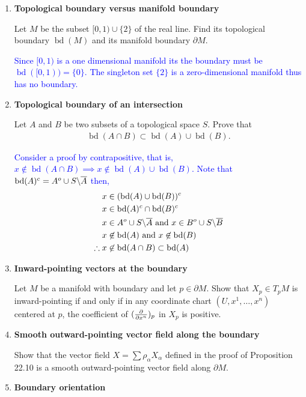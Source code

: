 \documentclass[12pt,a4paper]{report}
\newcommand{\BLUE}[1]{\textcolor{blue}{#1}}
\newcommand{\BD}{\operatorname{bd}}
\begin{document}
\HLINE
\begin{enumerate}[label=22.\arabic*]

\item \textbf{Topological boundary versus manifold boundary}

Let $M$ be the subset $[0,1) \cup \{2\}$ of the real line.  Find its topological boundary $\BD(M)$ and its manifold boundary $\partial M$.

\BLUE{
Since $[0,1)$ is a one dimensional manifold its the boundary must be $\BD([0,1)) = \{0\}$.  The singleton set $\{2\}$ is a zero-dimensional manifold thus has no boundary.
}

\item \textbf{Topological boundary of an intersection}

Let $A$ and $B$ be two subsets of a topological space $S$.  Prove that
\begin{align*}
	\BD(A \cap B) \subset \BD(A) \cup \BD(B).
\end{align*}

\BLUE{Consider a proof by contrapositive, that is, $x\not \in 	\BD(A \cap B) \implies  x\not \in \BD(A) \cup \BD(B)$.  Note that
$\BD(A)^c = A^o\cup S \backslash \CONJ{A}$ then,
\begin{align*}
	x &\in (\BD(A) \cup \BD(B))^c\\
	x &\in \BD(A)^c \cap \BD(B)^c \\
	x &\in A^o\cup S \backslash \CONJ{A} \AND x \in B^o\cup S \backslash \CONJ{B}\\
	x &\not \in \BD(A) \AND x \not \in \BD(B) \\
	\therefore x &\not \in \BD(A \cap B) \subset \BD(A)
\end{align*}
}

\item \textbf{Inward-pointing vectors at the boundary}

Let $M$ be a manifold with boundary and let $p \in \partial M$.  Show that $X_p\in T_pM$ is inward-pointing if and only if in any coordinate chart $(U,x^1,\dots,x^n)$ centered at $p$, the coefficient of $(\frac{\partial }{\partial x^n})_p$ in $X_p$ is positive.

\item \textbf{Smooth outward-pointing vector field along the boundary}

Show that the vector field $X = \sum \rho_\alpha X_\alpha$ defined in the proof of Proposition 22.10 is a smooth outward-pointing vector field along $\partial M$.

\item \textbf{Boundary orientation}


\end{enumerate}
\end{document}
